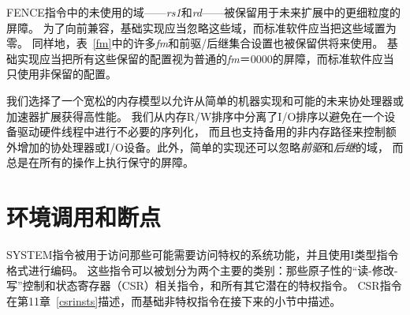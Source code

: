 FENCE指令中的未使用的域——{\em rs1}和{\em rd}——被保留用于未来扩展中的更细粒度的屏障。
为了向前兼容，基础实现应当忽略这些域，而标准软件应当把这些域置为零。
同样地，表~\ref{fm}中的许多{\em fm}和前驱/后继集合设置也被保留供将来使用。
基础实现应当把所有这些保留的配置视为普通的{\em fm}＝0000的屏障，而标准软件应当只使用非保留的配置。

\begin{commentary}
我们选择了一个宽松的内存模型以允许从简单的机器实现和可能的未来协处理器或加速器扩展获得高性能。
我们从内存R/W排序中分离了I/O排序以避免在一个设备驱动硬件线程中进行不必要的序列化，
而且也支持备用的非内存路径来控制额外增加的协处理器或I/O设备。此外，简单的实现还可以忽略{\em 前驱}和{\em 后继}的域，
而总是在所有的操作上执行保守的屏障。
\end{commentary}

\section{环境调用和断点}

SYSTEM指令被用于访问那些可能需要访问特权的系统功能，并且使用I类型指令格式进行编码。
这些指令可以被划分为两个主要的类别：那些原子性的“读-修改-写”控制和状态寄存器（CSR）相关指令，和所有其它潜在的特权指令。
CSR指令在第11章~\ref{csrinsts}描述，而基础非特权指令在接下来的小节中描述。


